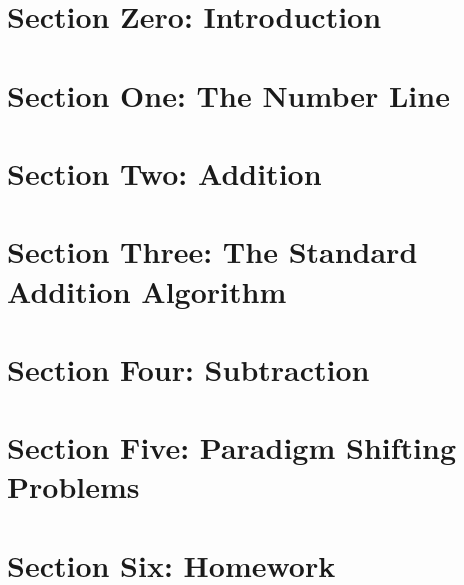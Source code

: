 \section{Section Zero: Introduction}
    
    \setcounter{sec0marks}{\thesecmarks}
\section{Section One: The Number Line}
    
    \setcounter{sec1marks}{\thesecmarks}
\section{Section Two: Addition}
    
    \setcounter{sec2marks}{\thesecmarks}
\section{Section Three: The Standard Addition \mbox{Algorithm}}
    
    \setcounter{sec3marks}{\thesecmarks}
\section{Section Four: Subtraction}
    
    \setcounter{sec4marks}{\thesecmarks}
\section{Section Five: Paradigm Shifting Problems}
    
    \setcounter{sec5marks}{\thesecmarks}
\section{Section Six: Homework}
    
    \setcounter{hwmarks}{\thesecmarks}
